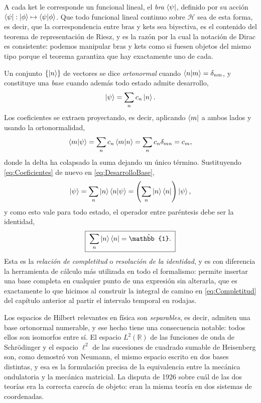         A cada ket le corresponde un funcional lineal, el \textit{bra} $\bra{\psi}$, definido por su acción $\bra{\psi}:\ket{\phi}\mapsto\braket{\psi|\phi}$. Que todo funcional lineal continuo sobre $\mathcal{H}$ sea de esta forma, es decir, que la correspondencia entre bras y kets sea biyectiva, es el contenido del teorema de representación de Riesz, y es la razón por la cual la notación de Dirac es consistente: podemos manipular bras y kets como si fuesen objetos del mismo tipo porque el teorema garantiza que hay exactamente uno de cada.

        Un conjunto $\{\ket{n}\}$ de vectores se dice \textit{ortonormal} cuando $\braket{n|m} = \delta_{nm}$, y constituye una \textit{base} cuando además todo estado admite desarrollo,
        \begin{equation}\label{eq:DesarrolloBase}
            \ket{\psi} = \sum_{n} c_{n}\ket{n} .
        \end{equation}
        Los coeficientes se extraen proyectando, es decir, aplicando $\bra{m}$ a ambos lados y usando la ortonormalidad,
        \begin{equation}\label{eq:Coeficientes}
            \braket{m|\psi} = \sum_{n}c_{n}\braket{m|n} = \sum_{n}c_{n}\delta_{mn} = c_{m},
        \end{equation}
        donde la delta ha colapsado la suma dejando un único término. Sustituyendo \eqref{eq:Coeficientes} de nuevo en \eqref{eq:DesarrolloBase},
        \begin{equation}\label{eq:CompletitudPaso}
            \ket{\psi} = \sum_{n}\ket{n}\braket{n|\psi} = \left(\sum_{n}\ket{n}\bra{n}\right)\ket{\psi},
        \end{equation}
        y como esto vale para todo estado, el operador entre paréntesis debe ser la identidad,
        \begin{equation}\label{eq:CompletitudHilbert}
            \boxed{\;\sum_{n}\ket{n}\bra{n} = \hat{\mathbb{1}} .\;}
        \end{equation}
        Esta es la \textit{relación de completitud} o \textit{resolución de la identidad}, y es con diferencia la herramienta de cálculo más utilizada en todo el formalismo: permite insertar una base completa en cualquier punto de una expresión sin alterarla, que es exactamente lo que hicimos al construir la integral de camino en \eqref{eq:Completitud} del capítulo anterior al partir el intervalo temporal en rodajas.

        Los espacios de Hilbert relevantes en física son \textit{separables}, es decir, admiten una base ortonormal numerable, y ese hecho tiene una consecuencia notable: todos ellos son isomorfos entre sí. El espacio $L^{2}(\mathbb{R})$ de las funciones de onda de Schrödinger y el espacio $\ell^{2}$ de las sucesiones de cuadrado sumable de Heisenberg son, como demostró von Neumann, el mismo espacio escrito en dos bases distintas, y esa es la formulación precisa de la equivalencia entre la mecánica ondulatoria y la mecánica matricial. La disputa de 1926 sobre cuál de las dos teorías era la correcta carecía de objeto: eran la misma teoría en dos sistemas de coordenadas.

